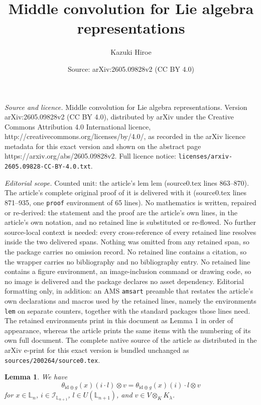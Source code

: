 \documentclass[10pt,a4paper]{amsart}
\title{Middle convolution for Lie algebra representations}
\author{Kazuki Hiroe}
\date{Source: arXiv:2605.09828v2 (CC BY 4.0)}
\newtheorem{lem}{Lemma}
\begin{document}
\maketitle

\noindent\emph{Source and licence.} Middle convolution for Lie algebra representations. Version arXiv:2605.09828v2 (CC BY 4.0), distributed by arXiv under the Creative Commons Attribution 4.0 International licence, http://creativecommons.org/licenses/by/4.0/, as recorded in the arXiv licence metadata for this exact version and shown on the abstract page https://arxiv.org/abs/2605.09828v2. Full licence notice: \texttt{licenses/arxiv-2605.09828-CC-BY-4.0.txt}.\par\smallskip

\noindent\textit{Editorial scope.} Counted unit: the article's lem lem (source0.tex lines 863--870). The article's complete original proof of it is delivered with it (source0.tex lines 871--935, one \texttt{proof} environment of 65 lines). No mathematics is written, repaired or re-derived: the statement and the proof are the article's own lines, in the article's own notation, and no retained line is substituted or re-flowed.  No further source-local context is needed: every cross-reference of every retained line resolves inside the two delivered spans.  Nothing was omitted from any retained span, so the package carries no omission record.  No retained line contains a citation, so the wrapper carries no bibliography and no bibliography entry.  No retained line contains a figure environment, an image-inclusion command or drawing code, so no image is delivered and the package declares no asset dependency.  Editorial formatting only, in addition: an AMS \texttt{amsart} preamble that restates the article's own declarations and macros used by the retained lines, namely the environments \texttt{lem} on separate counters, together with the standard packages those lines need.  The retained environments print in this document as Lemma 1 in order of appearance, whereas the article prints the same items with the numbering of its own full document.  The complete native source of the article as distributed in the arXiv e-print for this exact version is bundled unchanged as \texttt{sources/200264/source0.tex}.
\begin{lem}
We have 
\[
	\theta_{\mathrm{id}\oplus g}(x)(i\cdot l)\otimes v
	=\theta_{\mathrm{id}\oplus g}(x)(i)\cdot l\otimes v 
\]
for $x\in \mathbb{L}_{n}$, $i\in \mathcal{I}_{\mathbb{L}_{n+1}}$, $l\in U(\mathbb{L}_{n+1})$, and $v\in V\otimes_{K}K_{\lambda}$.
\end{lem} 
\end{document}
